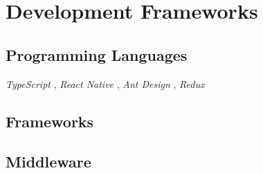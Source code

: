 \chapter{Development Frameworks} \label{ch:development_frameworks}

\section{Programming Languages}

\textit{TypeScript} \cite{type_script}, \textit{React Native} \cite{react_native}, \textit{Ant Design} \cite{ant_design}, \textit{Redux} \cite{redux}

\section{Frameworks}

\section{Middleware}
